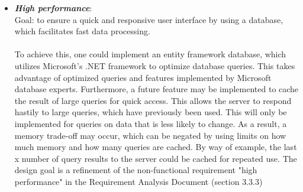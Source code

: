 \begin{itemize}
\item \textit{\bf{High performance}}: 
\\
Goal: to ensure a quick and responsive user interface by using a database, which facilitates fast data processing.  
\\\\
To achieve this, one could implement an entity framework database, which utilizes Microsoft's .NET framework to optimize database queries. This takes advantage of optimized queries and features implemented by Microsoft database experts. Furthermore, a future feature may be implemented to cache the result of large queries for quick access. This allows the server to respond hastily to large queries, which have previously been used. This will only be implemented for queries on data that is less likely to change. As a result, a memory trade-off may occur, which can be negated by using limits on how much memory and how many queries are cached. By way of example, the last x number of query results to the server could be cached for repeated use. The design goal is a refinement of the non-functional requirement "high performance" in the Requirement Analysis Document (section 3.3.3)

\end{itemize}